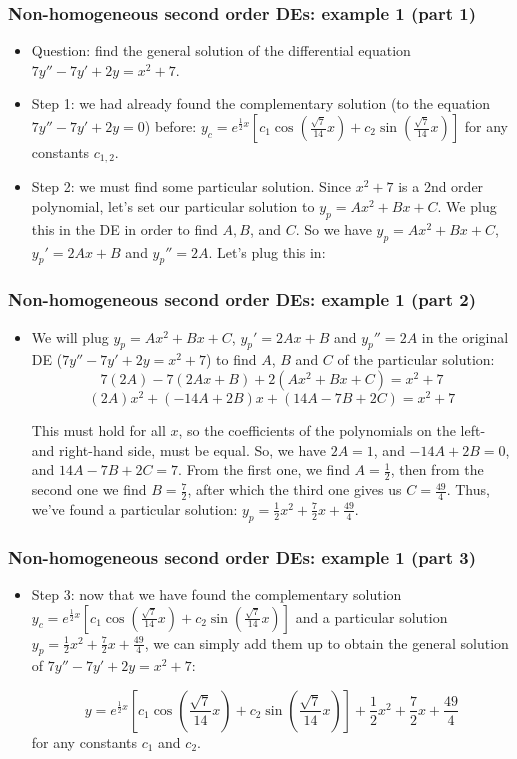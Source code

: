 \begin{frame}
\frametitle{Non-homogeneous second order DEs: example 1 (part 1)}


\begin{itemize}
\item Question: find the general solution of the differential equation $7y''-7y'+2y=x^2+7$.
\pause\item Step 1: we had already found the complementary solution (to the equation $7y''-7y'+2y=0$) before: ${y_c=e^{\frac{1}{2} x}\left[c_1\cos\left(\frac{\sqrt{7}}{14} x\right) + c_2\sin\left(\frac{\sqrt{7}}{14} x\right)\right]}$ for any constants $c_{1,2}$.
\pause\item Step 2: we must find some particular solution. Since $x^2+7$ is a 2nd order polynomial, let's set our particular solution to $y_p=Ax^2+Bx+C$. We plug this in the DE in order to find $A,B$, and $C$. 
\pause So we have $y_p=Ax^2+Bx+C$, $y_p'=2Ax+B$ and $y_p''=2A$. Let's plug this in:
\end{itemize}
\end{frame}

\begin{frame}
\frametitle{Non-homogeneous second order DEs: example 1 (part 2)}


\begin{itemize}
\item We will plug $y_p=Ax^2+Bx+C$, $y_p'=2Ax+B$ and $y_p''=2A$ in the original DE ($7y''-7y'+2y=x^2+7$) to find $A$, $B$ and $C$ of the particular solution:
\[7(2A)-7(2Ax+B)+2(Ax^2+Bx+C)=x^2+7\]
\[(2A)x^2+(-14A+2B)x+(14A-7B+2C)=x^2+7\]

\pause This must hold for all $x$, so the coefficients of the polynomials on the left- and right-hand side, must be equal. So, we have $2A=1$, and $-14A+2B=0$, and $14A-7B+2C=7$. \pause From the first one, we find $A=\frac{1}{2}$, then from the second one we find $B=\frac{7}{2}$, after which the third one gives us $C=\frac{49}{4}$. \pause Thus, we've found a particular solution: $y_p=\frac{1}{2}x^2+\frac{7}{2}x+\frac{49}{4}$.
\end{itemize}
\end{frame}

\begin{frame}
\frametitle{Non-homogeneous second order DEs: example 1 (part 3)}


\begin{itemize}
\item Step 3: now that we have found the complementary solution ${y_c=e^{\frac{1}{2} x}\left[c_1\cos\left(\frac{\sqrt{7}}{14} x\right) + c_2\sin\left(\frac{\sqrt{7}}{14} x\right)\right]}$ and a particular solution $y_p=\frac{1}{2}x^2+\frac{7}{2}x+\frac{49}{4}$, we can simply add them up to obtain the general solution of $7y''-7y'+2y=x^2+7$:

\[\boxed{{y=e^{\frac{1}{2} x}\left[c_1\cos\left(\frac{\sqrt{7}}{14} x\right) + c_2\sin\left(\frac{\sqrt{7}}{14} x\right)\right]}+\frac{1}{2}x^2+\frac{7}{2}x+\frac{49}{4}}\]
for any constants $c_1$ and $c_2$.
\end{itemize}
\end{frame}

